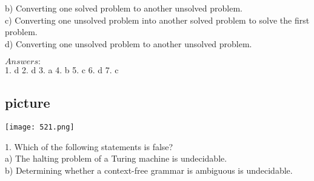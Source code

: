 \documentclass[11pt]{article}
\begin{document}
\begin{multicols}{2}
\vspace*{0.1cm}
\hspace*{0.5cm} b) Converting one solved problem to
another unsolved problem.\\

\vspace*{0.1cm}
\hspace*{0.5cm} c) Converting one unsolved problem into
another solved problem to solve the
first problem.\\

\vspace*{0.1cm}
\hspace*{0.5cm} d) Converting one unsolved problem to
another unsolved problem.\\
\end{multicols}

\vspace*{0.3cm}

$Answers:$\\
1. d  \hspace*{0.5cm}  2. d   \hspace*{0.5cm}  3. a   \hspace*{0.5cm}  4. b   \hspace*{0.5cm}  5. c   \hspace*{0.5cm}  6. d   \hspace*{0.5cm}  7. c\\

\vspace*{0.3cm}
\begin{center}
\section{picture}
\texttt{[image: 521.png]}
\end{center}

\hspace*{-0.4cm}
1. Which of the following statements is false?\\

\vspace*{0.1cm}
\hspace*{0.5cm} a) The halting problem of a Turing machine is undecidable.\\

\vspace*{0.1cm}
\hspace*{0.5cm} b) Determining whether a context-free grammar is ambiguous is undecidable.\\
\end{document}
